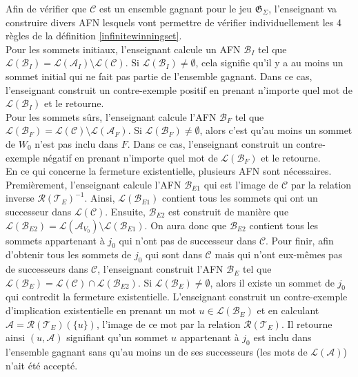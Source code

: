 \documentclass[12pt,a4paper,oneside,titlepage]{report}
\begin{document}
Afin de vérifier que $\mathcal{C}$ est un ensemble gagnant pour le jeu $\mathfrak{G}_\Sigma$, l'enseignant va construire divers AFN lesquels vont permettre de vérifier individuellement les 4 règles de la définition \ref{infinitewinningset}.\\

Pour les sommets initiaux, l'enseignant calcule un AFN $\mathcal{B}_I$ tel que $\mathcal{L}(\mathcal{B}_I)=\mathcal{L}(\mathcal{A}_I)\setminus\mathcal{L}(\mathcal{C})$. Si $\mathcal{L}(\mathcal{B}_I)\neq\emptyset$, cela signifie qu'il y a au moins un sommet initial qui ne fait pas partie de l'ensemble gagnant. Dans ce cas, l'enseignant construit un contre-exemple positif en prenant n'importe quel mot de $\mathcal{L}(\mathcal{B}_I)$ et le retourne.\\
Pour les sommets sûrs, l'enseignant calcule l'AFN $\mathcal{B}_F$ tel que $\mathcal{L}(\mathcal{B}_F)=\mathcal{L}(\mathcal{C})\setminus\mathcal{L}(\mathcal{A}_F)$. Si $\mathcal{L}(\mathcal{B}_F)\neq\emptyset$, alors c'est qu'au moins un sommet de $W_0$ n'est pas inclu dans $F$. Dans ce cas, l'enseignant construit un contre-exemple négatif en prenant n'importe quel mot de $\mathcal{L}(\mathcal{B}_F)$ et le retourne.\\
En ce qui concerne la fermeture existentielle, plusieurs AFN sont nécessaires. Premièrement, l'enseignant calcule l'AFN $\mathcal{B}_{E1}$ qui est l'image de $\mathcal{C}$ par la relation inverse $\mathcal{R}(\mathcal{T}_E)^{-1}$. Ainsi, $\mathcal{L}(\mathcal{B}_{E1})$ contient tous les sommets qui ont un successeur dans $\mathcal{L}(\mathcal{C})$. Ensuite, $\mathcal{B}_{E2}$ est construit de manière que $\mathcal{L}(\mathcal{B}_{E2})=\mathcal{L}(\mathcal{A}_{V_0})\setminus\mathcal{L}(\mathcal{B}_{E1})$. On aura donc que $\mathcal{B}_{E2}$ contient tous les sommets appartenant à $j_0$ qui n'ont pas de successeur dans $\mathcal{C}$. Pour finir, afin d'obtenir tous les sommets de $j_0$ qui sont dans $\mathcal{C}$ mais qui n'ont eux-mêmes pas de successeurs dans $\mathcal{C}$, l'enseignant construit l'AFN $\mathcal{B}_E$ tel que $\mathcal{L}(\mathcal{B}_E)=\mathcal{L}(\mathcal{C})\cap\mathcal{L}(\mathcal{B}_{E2})$. Si $\mathcal{L}(\mathcal{B}_E)\neq\emptyset$, alors il existe un sommet de $j_0$ qui contredit la fermeture existentielle. L'enseignant construit un contre-exemple d'implication existentielle en prenant un mot $u\in\mathcal{L}(\mathcal{B}_E)$ et en calculant $\mathcal{A}=\mathcal{R}(\mathcal{T}_E)(\{u\})$, l'image de ce mot par la relation $\mathcal{R}(\mathcal{T}_E)$. Il retourne ainsi $(u,\mathcal{A})$ signifiant qu'un sommet $u$ appartenant à $j_0$ est inclu dans l'ensemble gagnant sans qu'au moins un de ses successeurs (les mots de $\mathcal{L}(\mathcal{A})$) n'ait été accepté.\\
\end{document}
